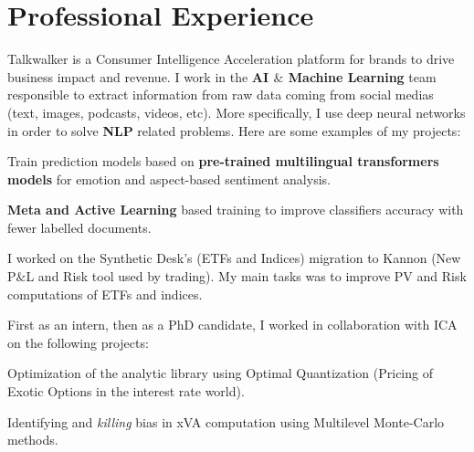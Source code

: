 \documentclass[]{deedy-resume-openfont}
\begin{document}
\lastupdated




\vspace{\topsep}

\section{Professional Experience}
\sectionsep

Talkwalker is a Consumer Intelligence Acceleration platform for brands to drive business impact and revenue. I work in the \textbf{AI $\&$ Machine Learning} team responsible to extract information from raw data coming from social medias (text, images, podcasts, videos, etc). More specifically, I use deep neural networks in order to solve \textbf{NLP} related problems. Here are some examples of my projects: $ $
\vspace{0.1cm}
\begin{tightemize}
	\item[\diamond] Train prediction models based on \textbf{pre-trained multilingual transformers models} for emotion and aspect-based sentiment analysis.
	\item[\diamond] \textbf{Meta and Active Learning} based training to improve classifiers accuracy with fewer labelled documents.
\end{tightemize}

\sectionsep
\sectionsep

I worked on the Synthetic Desk's (ETFs and Indices) migration to Kannon (New P$\&$L and Risk tool used by trading). My main tasks was to improve PV and Risk computations of ETFs and indices.

\sectionsep
\sectionsep


First as an intern, then as a PhD candidate, I worked in collaboration with ICA on the following projects:
\vspace{0.1cm}
\begin{tightemize}
	\item[\diamond] Optimization of the analytic library using Optimal Quantization (Pricing of Exotic Options in the interest rate world).
	\item[\diamond] Identifying and \textit{killing} bias in xVA computation using Multilevel Monte-Carlo methods.
\end{tightemize}
\end{document}
